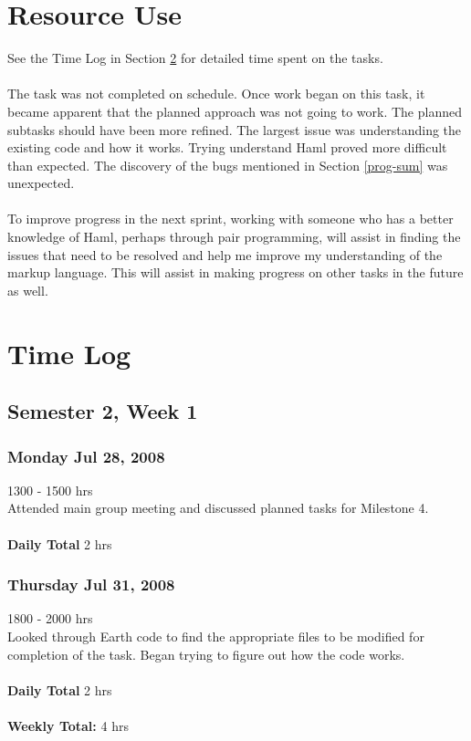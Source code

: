 \documentclass[10pt, a4]{article}
\begin{document}
\section{Resource Use}
See the Time Log in Section \ref{time-log} for detailed time spent on the tasks.\\
\\
The task was not completed on schedule. Once work began on this task, it became apparent that the planned approach was not going to work. The planned subtasks should have been more refined. The largest issue was understanding the existing code and how it works. Trying understand Haml proved more difficult than expected. The discovery of the bugs mentioned in Section \ref{prog-sum} was unexpected.\\
\\
To improve progress in the next sprint, working with someone who has a better knowledge of Haml, perhaps through pair programming, will assist in finding the issues that need to be resolved and help me improve my understanding of the markup language. This will assist in making progress on other tasks in the future as well.

\section{Time Log}
\label{time-log}
\subsection*{Semester 2, Week 1}
\subsubsection*{Monday Jul 28, 2008}
1300 - 1500 hrs\\
Attended main group meeting and discussed planned tasks for Milestone 4.\\
\\
\textbf{Daily Total} 2 hrs\\

\subsubsection*{Thursday Jul 31, 2008}
1800 - 2000 hrs\\
Looked through Earth code to find the appropriate files to be modified for completion of the task. Began trying to figure out how the code works.\\
\\
\textbf{Daily Total} 2 hrs\\
\\
\textbf{Weekly Total:} 4 hrs
\end{document}
